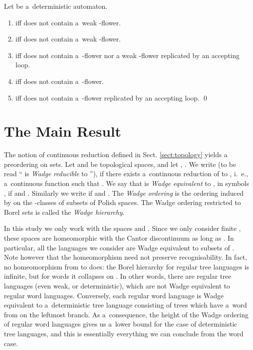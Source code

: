 \documentclass{LMCS}
\begin{document}
\begin{thm} \label{borelch}
Let  be a~deterministic automaton.
\begin{enumerate}[\em(1)]
\item  iff  does not contain a~weak -flower.
\item  iff  does not contain a~weak -flower.
\item  iff  does not contain a~-flower nor a weak -flower replicated by an accepting loop.
\item  iff  does not contain a~-flower.
\item  iff  does not contain a~-flower replicated by an accepting loop. \qed
\end{enumerate}
\end{thm}


\section{The Main Result}

The notion of continuous reduction defined in
Sect. \ref{sect:topology} yields a preordering on sets. Let  and
 be topological spaces, and let , .
We write  (to be read `` is {\em Wadge reducible} to
''), if there exists a~continuous reduction of  to , i.~e.,
a~continuous function  such that
. We say that  is {\em Wadge equivalent} to ,
in symbols , if  and . Similarly
we write  if  and . The {\em
  Wadge ordering} is the ordering induced by  on the
-classes of subsets of Polish spaces. The Wadge ordering
restricted to Borel sets is called the {\em Wadge hierarchy}.

In this study we only work with the spaces  and
. Since we only consider finite , these spaces
are homeomorphic with the Cantor discontinuum  as long
as . In particular, all the languages we consider are
Wadge equivalent to subsets of . Note however that the
homeomorphism need not preserve recognisability. In fact, no
homeomorphism from  to  does: the Borel
hierarchy for regular tree languages is infinite, but for words it
collapses on . In other words, there are regular tree
languages (even weak, or deterministic), which are not Wadge
equivalent to regular word languages. Conversely, each regular word
language  is Wadge equivalent to a~deterministic tree language 
consisting of trees which have a~word from  on the leftmost branch.
As a~consequence, the height of the Wadge ordering of regular word
languages gives us a~lower bound for the case of deterministic tree languages, and this is essentially everything we can conclude from the word case. 
\end{document}
